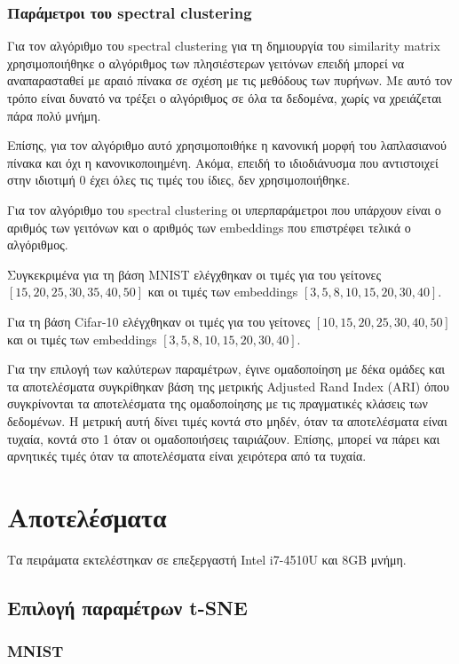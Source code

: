 \documentclass[a4paper]{article}
\begin{document}
\subsubsection{Παράμετροι του spectral clustering}

Για τον αλγόριθμο του spectral clustering για τη δημιουργία του similarity
matrix χρησιμοποιήθηκε ο αλγόριθμος των πλησιέστερων γειτόνων επειδή μπορεί να
αναπαρασταθεί με αραιό πίνακα σε σχέση με τις μεθόδους των πυρήνων. Με αυτό τον
τρόπο είναι δυνατό να τρέξει ο αλγόριθμος σε όλα τα δεδομένα, χωρίς να
χρειάζεται πάρα πολύ μνήμη.

Επίσης, για τον αλγόριθμο αυτό χρησιμοποιθήκε η κανονική μορφή του λαπλασιανού
πίνακα και όχι η κανονικοποιημένη. Ακόμα, επειδή το ιδιοδιάνυσμα που αντιστοιχεί
στην ιδιοτιμή 0 έχει όλες τις τιμές του ίδιες, δεν χρησιμοποιήθηκε.

Για τον αλγόριθμο του spectral clustering οι υπερπαράμετροι που υπάρχουν είναι ο
αριθμός των γειτόνων και ο αριθμός των embeddings που επιστρέφει τελικά ο
αλγόριθμος.

Συγκεκριμένα για τη βάση MNIST ελέγχθηκαν οι τιμές για του γείτονες $[15, 20,
25, 30, 35, 40, 50]$ και οι τιμές των embeddings $[3, 5, 8, 10, 15, 20, 30,
40]$.

Για τη βάση Cifar-10 ελέγχθηκαν οι τιμές για του γείτονες $[10, 15, 20, 25, 30,
40, 50]$ και οι τιμές των embeddings $[3, 5, 8, 10, 15, 20, 30, 40]$.

Για την επιλογή των καλύτερων παραμέτρων, έγινε ομαδοποίηση με δέκα ομάδες και
τα αποτελέσματα συγκρίθηκαν βάση της μετρικής Adjusted Rand Index (ARI) όπου
συγκρίνονται τα αποτελέσματα της ομαδοποίησης με τις πραγματικές κλάσεις των
δεδομένων. Η μετρική αυτή δίνει τιμές κοντά στο μηδέν, όταν τα αποτελέσματα
είναι τυχαία, κοντά στο 1 όταν οι ομαδοποιήσεις ταιριάζουν. Επίσης, μπορεί να
πάρει και αρνητικές τιμές όταν τα αποτελέσματα είναι χειρότερα από τα τυχαία.

\section{Αποτελέσματα}

Τα πειράματα εκτελέστηκαν σε επεξεργαστή Intel i7-4510U και 8GB μνήμη.


\subsection{Επιλογή παραμέτρων t-SNE}

\subsubsection{MNIST}
\end{document}
